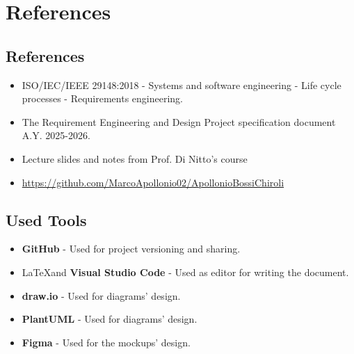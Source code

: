 \chapter{References}
\label{ch:references}

\section{References}
\label{sec:references}

\begin{itemize}
    \item ISO/IEC/IEEE 29148:2018 - Systems and software engineering - Life cycle processes - Requirements engineering.
    \item The Requirement Engineering and Design Project specification document A.Y. 2025-2026.
    \item Lecture slides and notes from Prof. Di Nitto's course
    \item \url{https://github.com/MarcoApollonio02/ApollonioBossiChiroli}
\end{itemize}
\section{Used Tools}
\label{sec:used-tools}

\begin{itemize}
	\item \textbf{GitHub} - Used for project versioning and sharing.
	\item \LaTeX \space and \textbf{Visual Studio Code} - Used as editor for writing the document.
	\item \textbf{draw.io} - Used for diagrams' design.
    \item \textbf{PlantUML} - Used for diagrams' design.
	\item \textbf{Figma} - Used for the mockups' design.
\end{itemize}
